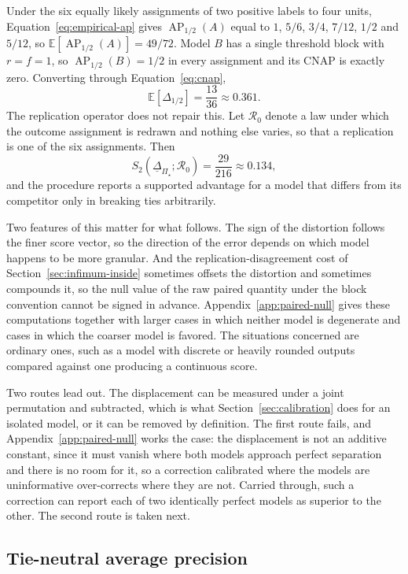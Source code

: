 \documentclass[11pt]{article}
\newcommand{\AP}{\operatorname{AP}}
\newcommand{\Regime}{\mathcal{R}}
\newcommand{\PSet}{\Pi_\star}
\newcommand{\E}{\mathbb{E}}
\newcommand{\RobDelta}{\underline{\Delta}_{\PSet}}
\theoremstyle{remark}
\begin{document}
Under the six equally likely assignments of two positive labels to four units, Equation~\eqref{eq:empirical-ap} gives $\AP_{1/2}(A)$ equal to $1$, $5/6$, $3/4$, $7/12$, $1/2$ and $5/12$, so $\E[\AP_{1/2}(A)]=49/72$. Model $B$ has a single threshold block with $r=f=1$, so $\AP_{1/2}(B)=1/2$ in every assignment and its CNAP is exactly zero. Converting through Equation~\eqref{eq:cnap},
\[
\E\left[\Delta_{1/2}\right]
=
\frac{13}{36}
\approx
0.361 .
\]
The replication operator does not repair this. Let $\Regime_0$ denote a law under which the outcome assignment is redrawn and nothing else varies, so that a replication is one of the six assignments. Then
\[
S_2(\RobDelta;\Regime_0)
=
\frac{29}{216}
\approx
0.134 ,
\]
and the procedure reports a supported advantage for a model that differs from its competitor only in breaking ties arbitrarily.

Two features of this matter for what follows. The sign of the distortion follows the finer score vector, so the direction of the error depends on which model happens to be more granular. And the replication-disagreement cost of Section~\ref{sec:infimum-inside} sometimes offsets the distortion and sometimes compounds it, so the null value of the raw paired quantity under the block convention cannot be signed in advance. Appendix~\ref{app:paired-null} gives these computations together with larger cases in which neither model is degenerate and cases in which the coarser model is favored. The situations concerned are ordinary ones, such as a model with discrete or heavily rounded outputs compared against one producing a continuous score.

Two routes lead out. The displacement can be measured under a joint permutation and subtracted, which is what Section~\ref{sec:calibration} does for an isolated model, or it can be removed by definition. The first route fails, and Appendix~\ref{app:paired-null} works the case: the displacement is not an additive constant, since it must vanish where both models approach perfect separation and there is no room for it, so a correction calibrated where the models are uninformative over-corrects where they are not. Carried through, such a correction can report each of two identically perfect models as superior to the other. The second route is taken next.

\subsection{Tie-neutral average precision}
\label{sec:paired-convention}
\end{document}
